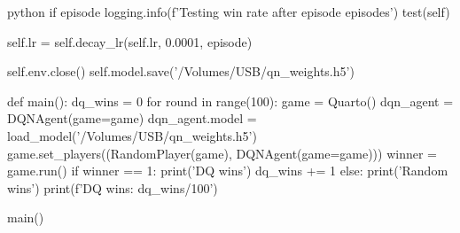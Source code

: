 \begin{mintedbox}{python}
            if episode %
                logging.info(f'Testing win rate after {episode} episodes')
                test(self)

            self.lr = self.decay_lr(self.lr, 0.0001, episode)

        self.env.close()
        self.model.save('/Volumes/USB/qn_weights.h5')

def main():
    dq_wins = 0
    for round in range(100):
        game = Quarto()
        dqn_agent = DQNAgent(game=game)
        dqn_agent.model = load_model('/Volumes/USB/qn_weights.h5')
        game.set_players((RandomPlayer(game), DQNAgent(game=game)))
        winner = game.run()
        if winner == 1:
            print('DQ wins')
            dq_wins += 1
        else:
            print('Random wins')
    print(f'DQ wins: {dq_wins/100}')

main()
\end{mintedbox}


